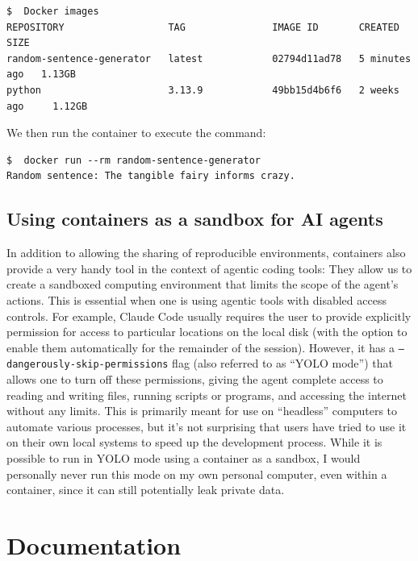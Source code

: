 \begin{lstlisting}[style=shellshort]
$  Docker images
REPOSITORY                  TAG               IMAGE ID       CREATED         SIZE
random-sentence-generator   latest            02794d11ad78   5 minutes ago   1.13GB
python                      3.13.9            49bb15d4b6f6   2 weeks ago     1.12GB
\end{lstlisting}

We then run the container to execute the command:

\begin{lstlisting}[style=shellshort]
$  docker run --rm random-sentence-generator
Random sentence: The tangible fairy informs crazy.
\end{lstlisting}

\subsection{Using containers as a sandbox for AI agents}

In addition to allowing the sharing of reproducible environments, containers also provide a very handy tool in the context of agentic coding tools: They allow us to create a sandboxed computing environment that limits the scope of the agent's actions.  This is essential when one is using agentic tools with disabled access controls.  For example, Claude Code usually requires the user to provide explicitly permission for access to particular locations on the local disk (with the option to enable them automatically for the remainder of the session).  However, it has a \texttt{--dangerously-skip-permissions} flag (also referred to as ``YOLO mode'') that allows one to turn off these permissions, giving the agent complete access to reading and writing files, running scripts or programs, and accessing the internet without any limits.  This is primarily meant for use on ``headless'' computers to automate various processes, but it's not surprising that users have tried to use it on their own local systems to speed up the development process. While it is possible to run in YOLO mode using a container as a sandbox, I would personally never run this mode on my own personal computer, even within a container, since it can still potentially leak private data.

\section{Documentation}

